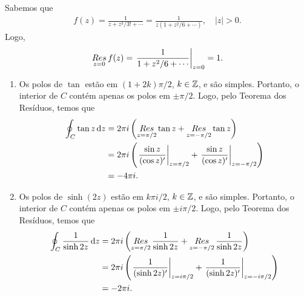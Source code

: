 \begin{questions}
%
\begin{solution}
    Sabemos que
    \begin{align*}
        f(z) = \frac{1}{z+z^3/3!+\cdots} = \frac{1}{z(1+z^2/6+\cdots)}, \quad |z|>0.
    \end{align*}
    Logo,\vspace{-5mm}
    \begin{align*}
        \mathop{Res}\limits_{z = 0} f(z) = \left.\frac{1}{1+z^2/6+\cdots}\right|_{z=0} = 1.
    \end{align*}
\end{solution}

%
\begin{solution}
\begin{enumerate}[label=(\alph*)]
    \item Os polos de $\tan$ estão em $(1+2k)\pi/2$, $k\in{\mathbb Z}$, e são simples.
    Portanto, o interior de $C$ contém apenas os polos em $\pm\pi/2$. Logo, pelo Teorema dos Resíduos, temos que
    \begin{align*}
        \oint_C \tan z\,\mathrm{d} z 
            &= 2\pi i \left(\mathop{Res}\limits_{z=\pi/2}\tan z + \mathop{Res}\limits_{z=-\pi/2} \tan z\right) \\
            &= 2\pi i \left(\left.\frac{\sin z}{(\cos z)'}\right|_{z=\pi/2} + \left.\frac{\sin z}{(\cos z)'}\right|_{z=-\pi/2} \right)\\
            &= -4\pi i.
    \end{align*}
    
    \item Os polos de $\sinh(2z)$ estão em $k \pi i/2$, $k\in{\mathbb Z}$, e são simples.
    Portanto, o interior de $C$ contém apenas os polos em $\pm i \pi/2$. Logo, pelo Teorema dos Resíduos, temos que
    \begin{align*}
        \oint_C \frac{1}{\sinh 2z}\,\mathrm{d} z 
            &= 2\pi i \left(\mathop{Res}\limits_{z=\pi/2}\frac{1}{\sinh 2z} + \mathop{Res}\limits_{z=-\pi/2} \frac{1}{\sinh 2z}\right) \\
            &= 2\pi i \left( \left.\frac{1}{(\sinh 2z)'}\right|_{z=i\pi/2} + \left.\frac{1}{(\sinh 2z)'}\right|_{z=-i\pi/2} \right)\\
            &= -2\pi i.
    \end{align*}
\end{enumerate}
\end{solution}


\end{questions}
